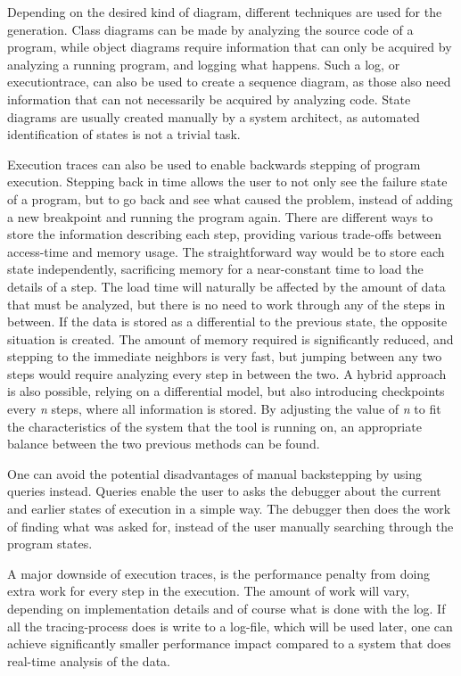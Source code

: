 Depending on the desired kind of diagram, different techniques are used for the generation.
Class diagrams can be made by analyzing the source code of a program, while object diagrams require information that can only be acquired by analyzing a running program, and logging what happens.
Such a log, or \gls{executiontrace}, can also be used to create a sequence diagram, as those also need information that can not necessarily be acquired by analyzing code.
State diagrams are usually created manually by a system architect, as automated identification of states is not a trivial task.

Execution traces can also be used to enable backwards stepping of program execution.
Stepping back in time allows the user to not only see the failure state of a program, but to go back and see what caused the problem, instead of adding a new \gls{breakpoint} and running the program again.
There are different ways to store the information describing each step, providing various trade-offs between access-time and memory usage.
The straightforward way would be to store each state independently, sacrificing memory for a near-constant time to load the details of a step.
The load time will naturally be affected by the amount of data that must be analyzed, but there is no need to work through any of the steps in between.
If the data is stored as a differential to the previous state, the opposite situation is created.
The amount of memory required is significantly reduced, and stepping to the immediate neighbors is very fast, but jumping between any two steps would require analyzing every step in between the two.
A hybrid approach is also possible, relying on a differential model, but also introducing checkpoints every \textit{n} steps, where all information is stored.
By adjusting the value of \textit{n} to fit the characteristics of the system that the tool is running on, an appropriate balance between the two previous methods can be found.

One can avoid the potential disadvantages of manual backstepping by using queries instead.
Queries enable the user to asks the debugger about the current and earlier states of execution in a simple way.
The debugger then does the work of finding what was asked for, instead of the user manually searching through the program states.

A major downside of execution traces, is the performance penalty from doing extra work for every step in the execution.
The amount of work will vary, depending on implementation details and of course what is done with the log.
If all the tracing-process does is write to a log-file, which will be used later, one can achieve significantly smaller performance impact compared to a system that does real-time analysis of the data.

